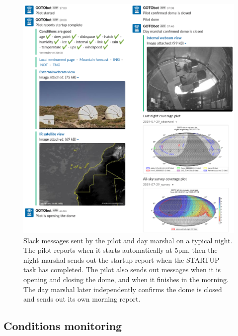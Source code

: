 \begin{colsection}
\begin{colsection}
\begin{figure}[p]
    \begin{center}
    \includegraphics[width=\linewidth]{images/slack2.png}
    \end{center}
    \caption[Slack messages sent by the pilot and day marshal]{
        Slack messages sent by the pilot and day marshal on a typical night. The pilot reports when it starts automatically at 5pm, then the night marshal sends out the startup report when the STARTUP task has completed. The pilot also sends out messages when it is opening and closing the dome, and when it finishes in the morning. The day marshal later independently confirms the dome is closed and sends out its own morning report.
    }\label{fig:pilot_slack}
\end{figure}

\end{colsection}


\newpage
\subsection{Conditions monitoring}
\label{sec:conditions}
\begin{colsection}


\end{colsection}
\end{colsection}
